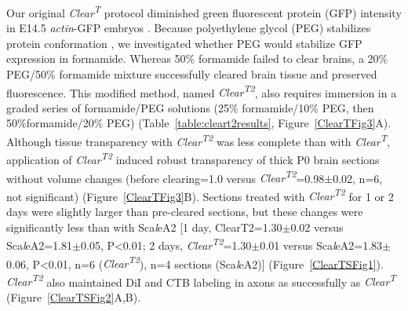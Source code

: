 Our original \emph{Clear\textsuperscript{T}} protocol diminished green fluorescent protein (GFP) intensity in E14.5 \emph{actin}-GFP embryos \cite{ikawa1995rapid}.
Because polyethylene glycol (PEG) stabilizes protein conformation \cite{rawat2010molecular}, we investigated whether PEG would stabilize GFP expression in formamide.
Whereas 50\% formamide failed to clear brains, a 20\% PEG/50\% formamide mixture successfully cleared brain tissue and preserved fluorescence.
This modified method, named \emph{Clear\textsuperscript{T2}}, also requires immersion in a graded series of formamide/PEG solutions (25\% formamide/10\% PEG, then 50\%formamide/20\% PEG) (Table~\ref{table:cleart2results}, Figure~\ref{ClearTFig3}A).
Although tissue transparency with \emph{Clear\textsuperscript{T2}} was less complete than with \emph{Clear\textsuperscript{T}}, application of \emph{Clear\textsuperscript{T2}} induced robust transparency of thick P0 brain sections without volume changes (before clearing=1.0 versus \emph{Clear\textsuperscript{T2}}=0.98$\pm$0.02, n=6, not significant) (Figure~\ref{ClearTFig3}B).
Sections treated with \emph{Clear\textsuperscript{T2}} for 1 or 2 days were slightly larger than pre-cleared sections, but these changes were significantly less than with Sca\emph{l}eA2 [1 day, ClearT2=1.30$\pm$0.02 versus Sca\emph{l}eA2=1.81$\pm$0.05, P<0.01; 2 days, \emph{Clear\textsuperscript{T2}}=1.30$\pm$0.01 versus Sca\emph{l}eA2=1.83$\pm$0.06, P<0.01, n=6 (\emph{Clear\textsuperscript{T2}}), n=4 sections (Sca\emph{l}eA2)] (Figure~\ref{ClearTSFig1}).
\emph{Clear\textsuperscript{T2}} also maintained DiI and CTB labeling in axons as successfully as \emph{Clear\textsuperscript{T}} (Figure~\ref{ClearTSFig2}A,B).
